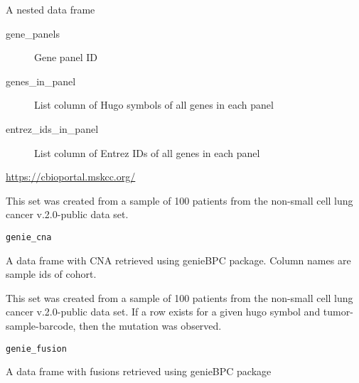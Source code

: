 \documentclass[a4paper]{book}
\begin{document}
\begin{Format}
A nested data frame
\begin{description}

\item[gene\_panels] Gene panel ID
\item[genes\_in\_panel] List column of Hugo symbols of all genes in each panel
\item[entrez\_ids\_in\_panel] List column of Entrez IDs of all genes in each panel

\end{description}

\end{Format}
%
\begin{Source}\relax
\url{https://cbioportal.mskcc.org/}
\end{Source}
%
\begin{Description}\relax
This set was created from a sample of 100 patients from the non-small cell
lung cancer v.2.0-public data set.
\end{Description}
%
\begin{Usage}
\begin{verbatim}
genie_cna
\end{verbatim}
\end{Usage}
%
\begin{Format}
A data frame with CNA retrieved using genieBPC package. Column names are sample ids of cohort.
\end{Format}
%
\begin{Description}\relax
This set was created from a sample of 100 patients from the non-small cell
lung cancer v.2.0-public data set. If a row exists for a given hugo symbol
and tumor-sample-barcode, then the mutation was observed.
\end{Description}
%
\begin{Usage}
\begin{verbatim}
genie_fusion
\end{verbatim}
\end{Usage}
%
\begin{Format}
A data frame with fusions retrieved using genieBPC package
\end{Format}
\end{document}
